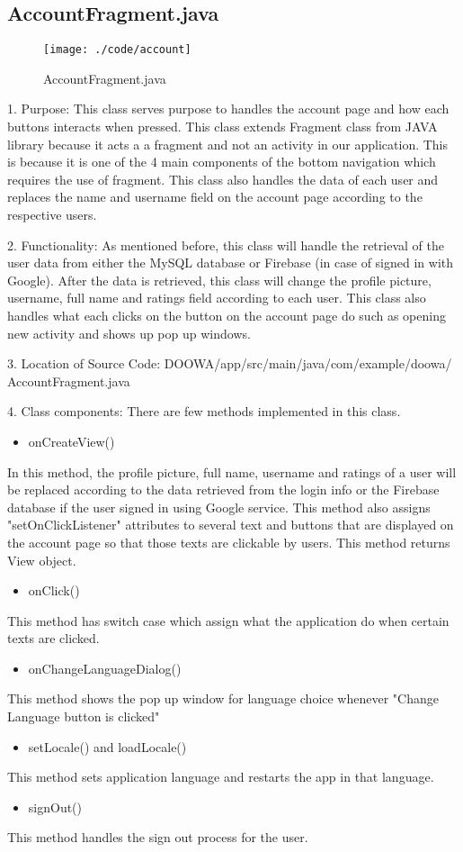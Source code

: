\documentclass[conference]{IEEEtran}
\begin{document}
\subsection{AccountFragment.java}

\begin{figure}[h!]
\texttt{[image: ./code/account]}
\centering
\caption{AccountFragment.java}
\end{figure}

1. Purpose: This class serves purpose to handles the account page and how each buttons interacts when pressed. This class extends Fragment class from JAVA library because it acts a a fragment and not an activity in our application. This is because it is one of the 4 main components of the bottom navigation which requires the use of fragment. This class also handles the data of each user and replaces the name and username field on the account page according to the respective users.\break
\par 2. Functionality: As mentioned before, this class will handle the retrieval of the user data from either the MySQL database or Firebase (in case of signed in with Google). After the data is retrieved, this class will change the profile picture, username, full name and ratings field according to each user. This class also handles what each clicks on the button on the account page do such as opening new activity and shows up pop up windows.\break

3. Location of Source Code: DOOWA/app/src/main/java/com/example/doowa/ AccountFragment.java\break

4. Class components: There are few methods implemented in this class.
\begin{itemize}
\item onCreateView()
\end{itemize}
In this method, the profile picture, full name, username and ratings of a user will be replaced according to the data retrieved from the login info or the Firebase database if the user signed in using Google service. This method also assigns "setOnClickListener" attributes to several text and buttons that are displayed on the account page so that those texts are clickable by users. This method returns View object.
\begin{itemize}
\item onClick()
\end{itemize}
This method has switch case which assign what the application do when certain texts are clicked.
\begin{itemize}
\item onChangeLanguageDialog()
\end{itemize}
This method shows the pop up window for language choice whenever "Change Language button is clicked"
\begin{itemize}
\item setLocale() and loadLocale()
\end{itemize}
This method sets application language and restarts the app in that language.
\begin{itemize}
\item signOut()
\end{itemize}
This method handles the sign out process for the user.
\break
\end{document}

